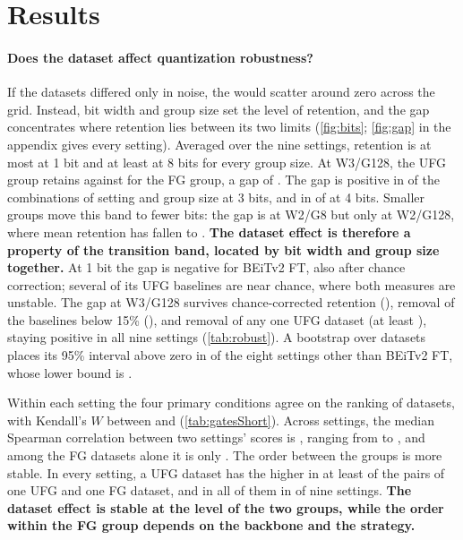 \section{Results}
\label{sec:results}

\paragraph{Does the dataset affect quantization robustness?}
If the datasets differed only in noise, the  would scatter around zero across the grid.
Instead, bit width and group size set the level of retention, and the gap concentrates where retention lies between its two limits (\cref{fig:bits}; \cref{fig:gap} in the appendix gives every setting).
Averaged over the nine settings, retention is at most  at 1 bit and at least  at 8 bits for every group size.
At W3/G128, the UFG group retains  against  for the FG group, a gap of .
The gap is positive in  of the  combinations of setting and group size at 3 bits, and in  of  at 4 bits.
Smaller groups move this band to fewer bits: the gap is  at W2/G8 but only  at W2/G128, where mean retention has fallen to .
\textbf{The dataset effect is therefore a property of the transition band, located by bit width and group size together.}
At 1 bit the gap is negative for BEiTv2 FT, also after chance correction; several of its UFG baselines are near chance, where both measures are unstable.
The gap at W3/G128 survives chance-corrected retention (), removal of the  baselines below 15\% (), and removal of any one UFG dataset (at least ), staying positive in all nine settings (\cref{tab:robust}).
A bootstrap over datasets places its 95\% interval above zero in  of the eight settings other than BEiTv2 FT, whose lower bound is .

Within each setting the four primary conditions agree on the ranking of datasets, with Kendall's $W$ between  and  (\cref{tab:gatesShort}).
Across settings, the median Spearman correlation between two settings' scores is , ranging from  to , and among the FG datasets alone it is only .
The order between the groups is more stable.
In every setting, a UFG dataset has the higher  in at least  of the pairs of one UFG and one FG dataset, and in all of them in  of nine settings.
\textbf{The dataset effect is stable at the level of the two groups, while the order within the FG group depends on the backbone and the strategy.}

